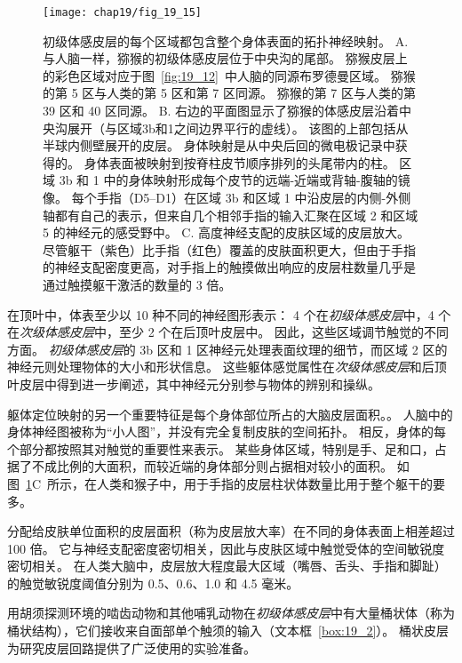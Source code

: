\begin{figure}[htbp]
	\centering
	\texttt{[image: chap19/fig\_19\_15]}
	\caption{初级体感皮层的每个区域都包含整个身体表面的拓扑神经映射\cite{nelson1980representations}。
		A. 与人脑一样，猕猴的初级体感皮层位于中央沟的尾部。
		猕猴皮层上的彩色区域对应于图~\ref{fig:19_12}~中人脑的同源布罗德曼区域。
		猕猴的第 5 区与人类的第 5 区和第 7 区同源。
		猕猴的第 7 区与人类的第 39 区和 40 区同源。
		B. 右边的平面图显示了猕猴的体感皮层沿着中央沟展开（与区域3b和1之间边界平行的虚线）。
		该图的上部包括从半球内侧壁展开的皮层。
		身体映射是从中央后回的微电极记录中获得的。
		身体表面被映射到按脊柱皮节顺序排列的头尾带内的柱。
		区域 3b 和 1 中的身体映射形成每个皮节的远端-近端或背轴-腹轴的镜像。
		每个手指（D5–D1）在区域 3b 和区域 1 中沿皮层的内侧-外侧轴都有自己的表示，但来自几个相邻手指的输入汇聚在区域 2 和区域 5 的神经元的感受野中。
		C. 高度神经支配的皮肤区域的皮层放大。
		尽管躯干（紫色）比手指（红色）覆盖的皮肤面积更大，但由于手指的神经支配密度更高，对手指上的触摸做出响应的皮层柱数量几乎是通过触摸躯干激活的数量的 3 倍。}
	\label{fig:19_15}
\end{figure}


在顶叶中，体表至少以 10 种不同的神经图形表示：
4 个在\textit{初级体感皮层}中，4 个在\textit{次级体感皮层}中，至少 2 个在后顶叶皮层中。
因此，这些区域调节触觉的不同方面。
\textit{初级体感皮层}的 3b 区和 1 区神经元处理表面纹理的细节，而区域 2 区的神经元则处理物体的大小和形状信息。
这些躯体感觉属性在\textit{次级体感皮层}和后顶叶皮层中得到进一步阐述，其中神经元分别参与物体的辨别和操纵。


躯体定位映射的另一个重要特征是每个身体部位所占的大脑皮层面积。。
人脑中的身体神经图被称为“小人图”，并没有完全复制皮肤的空间拓扑。
相反，身体的每个部分都按照其对触觉的重要性来表示。
某些身体区域，特别是手、足和口，占据了不成比例的大面积，而较近端的身体部分则占据相对较小的面积。
如图~\ref{fig:19_15}C~所示，在人类和猴子中，用于手指的皮层柱状体数量比用于整个躯干的要多。


分配给皮肤单位面积的皮层面积（称为皮层放大率）在不同的身体表面上相差超过 100 倍。
它与神经支配密度密切相关，因此与皮肤区域中触觉受体的空间敏锐度密切相关。
在人类大脑中，皮层放大程度最大区域（嘴唇、舌头、手指和脚趾）的触觉敏锐度阈值分别为 0.5、0.6、1.0 和 4.5 毫米。


用胡须探测环境的啮齿动物和其他哺乳动物在\textit{初级体感皮层}中有大量桶状体（称为桶状结构），它们接收来自面部单个触须的输入（文本框~\ref{box:19_2}）。
桶状皮层为研究皮层回路提供了广泛使用的实验准备。



